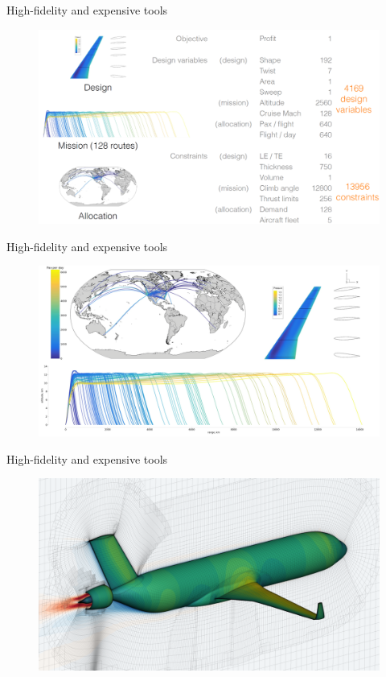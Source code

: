 \documentclass[aspectratio=169, usenames,dvipsnames, 14pt]{beamer}
\begin{document}
\begin{frame}{High-fidelity and expensive tools}
	\begin{figure}
		\includegraphics[scale=0.4]{images/slide_123.png}
	\end{figure}
\end{frame}
			
\begin{frame}{High-fidelity and expensive tools}
	\begin{figure}
		\includegraphics[scale=.45]{images/slide_124.png}
	\end{figure}
\end{frame}

\begin{frame}{High-fidelity and expensive tools}
	\begin{figure}
		\includegraphics[scale=0.38]{images/slide_125.png}
	\end{figure}
\end{frame}
\end{document}
